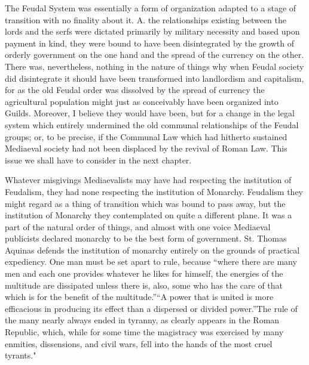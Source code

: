\documentclass{book}
\begin{document}
The Feudal System was essentially a form of organization adapted to a stage of transition with no finality about it. A. the relationships existing between the lords and the serfs were dictated primarily by military necessity and based upon payment in kind, they were bound to have been disintegrated by the growth of orderly government on the one hand and the spread of the currency on the other. There was, nevertheless, nothing in the nature of things why when Feudal society did disintegrate it should have been transformed into landlordism and capitalism, for as the old Feudal order was dissolved by the spread of currency the agricultural population might just as conceivably have been organized into Guilds. Moreover, I believe they would have been, but for a change in the legal system which entirely undermined the old communal relationships of the Feudal groups; or, to be precise, if the Communal Law which had hitherto sustained Mediaeval society had not been displaced by the revival of Roman Law. This issue we shall have to consider in the next chapter.

Whatever misgivings Mediaevalists may have had respecting the institution of Feudalism, they had none respecting the institution of Monarchy. Feudalism they might regard as a thing of transition which was bound to pass away, but the institution of Monarchy they contemplated on quite a different plane. It was a part of the natural order of things, and almost with one voice Mediaeval publicists declared monarchy to be the best form of government. St. Thomas Aquinas defends the institution of monarchy entirely on the grounds of practical expediency. One man must be set apart to rule, because “where there are many men and each one provides whatever he likes for himself, the energies of the multitude are dissipated unless there is, also, some who has the care of that which is for the benefit of the multitude.”\footnotemark[2] “A power that is united is more efficacious in producing its effect than a dispersed or divided power.”\footnotemark[3] The rule of the many nearly always ended in tyranny, as clearly appears in the Roman Republic, which, while for some time the magistracy was exercised by many enmities, dissensions, and civil wars, fell into the hands of the most cruel tyrants."\footnotemark[4]
\end{document}
